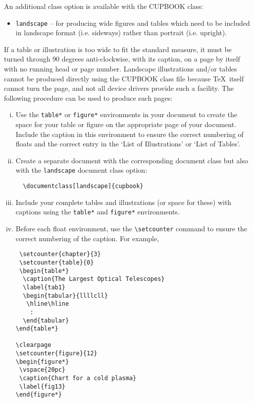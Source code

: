 \documentclass[cup6a]{cupbook}
\begin{document}
An additional class option is available with the CUPBOOK class:
 \begin{itemize}\listsize
  \item \texttt{landscape} -- for producing wide figures and tables which
 need to be included in landscape format (i.e. sideways) rather
 than portrait (i.e. upright).
 \end{itemize}
 If a table or illustration is too wide to fit the standard measure, it
must be turned through 90 degrees anti-clockwise, with its caption, on
a page by itself with no running head or page number.
 Landscape illustrations and/or tables cannot be produced directly
using the CUPBOOK class file because \TeX\ itself cannot turn the
page, and not all device drivers provide such a facility.
 The following procedure can be used to produce such pages:
 \begin{enumerate}[(iii)]\listsize
  \item Use the \verb"table*" or \verb"figure*" environments in your
        document to create the space for your table or figure on the
        appropriate page of your document.
         Include the caption in this environment to ensure the correct
        numbering of floats and the correct entry in the `List of
        Illustrations' or `List of Tables'.
  \item Create a separate document with the corresponding document class
        but also with the \verb"landscape" document class option:
\begin{verbatim}
  \documentclass[landscape]{cupbook}
\end{verbatim}
  \item Include your complete tables and illustrations (or space for
        these) with captions using the \verb"table*" and \verb"figure*"
        environments.
  \item Before each float environment, use the \verb"\setcounter"
        command to ensure the correct numbering of the caption.
         For example,
\begin{verbatim}
 \setcounter{chapter}{3}
 \setcounter{table}{0}
 \begin{table*}
  \caption{The Largest Optical Telescopes}
  \label{tab1}
  \begin{tabular}{llllcll}
   \hline\hline
    :
  \end{tabular}
\end{table*}

\clearpage
\setcounter{figure}{12}
\begin{figure*}
 \vspace{20pc}
 \caption{Chart for a cold plasma}
 \label{fig13}
\end{figure*}
\end{verbatim}
 \end{enumerate}
\end{document}
